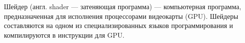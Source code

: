 Шейдер (англ. shader — затеняющая программа) — компьютерная программа, предназначенная для исполнения процессорами видеокарты (GPU).
Шейдеры составляются на одном из специализированных языков программирования и компилируются в инструкции для GPU.